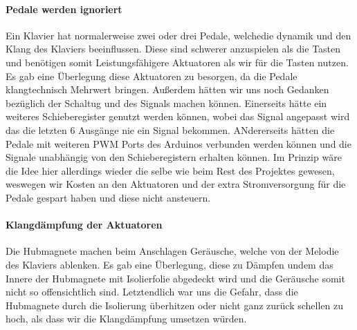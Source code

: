 \paragraph{Pedale werden ignoriert}
Ein Klavier hat normalerweise zwei oder drei Pedale, welchedie dynamik und den Klang des Klaviers beeinflussen.
Diese sind schwerer anzuspielen als die Tasten und benötigen somit Leistungsfähigere Aktuatoren als wir für die
Tasten nutzen. Es gab eine Überlegung diese Aktuatoren zu besorgen, da die Pedale klangtechnisch Mehrwert bringen.
Außerdem hätten wir uns noch Gedanken bezüglich der Schaltug und des Signals machen können. Einerseits hätte ein weiteres
Schieberegister genutzt werden können, wobei das Signal angepasst wird das die letzten 6 Ausgänge nie ein Signal bekommen.
ANdererseits hätten die Pedale mit weiteren PWM Ports des Arduinos verbunden werden können und die Signale unabhängig von den
Schieberegistern erhalten können. Im Prinzip wäre die Idee hier allerdings wieder die selbe wie beim Rest des Projektes gewesen,
weswegen wir Kosten an den Aktuatoren und der extra Stromversorgung für die Pedale gespart haben und diese nicht ansteuern.

\paragraph{Klangdämpfung der Aktuatoren}
Die Hubmagnete machen beim Anschlagen Geräusche, welche von der Melodie des Klaviers ablenken. Es gab eine Überlegung,
diese zu Dämpfen undem das Innere der Hubmagnete mit Isolierfolie abgedeckt wird und die Geräusche somit nicht so
offensichtlich sind. Letztendlich war uns die Gefahr, dass die Hubmagnete durch die Isolierung überhitzen oder nicht ganz
zurück schellen zu hoch, als dass wir die Klangdämpfung umsetzen würden.